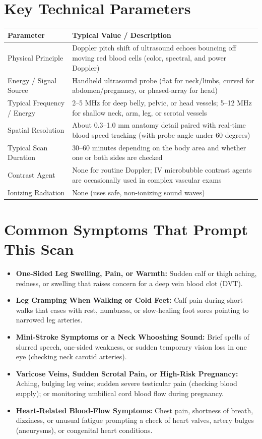 \section{Key Technical Parameters}
\noindent
\begin{tabularx}{\textwidth}{@{}l X@{}}
\toprule
\textbf{Parameter} & \textbf{Typical Value / Description} \\
\midrule
Physical Principle & Doppler pitch shift of ultrasound echoes bouncing off moving red blood cells (color, spectral, and power Doppler) \\
Energy / Signal Source & Handheld ultrasound probe (flat for neck/limbs, curved for abdomen/pregnancy, or phased-array for head) \\
Typical Frequency / Energy & 2--5 MHz for deep belly, pelvic, or head vessels; 5--12 MHz for shallow neck, arm, leg, or scrotal vessels \\
Spatial Resolution & About 0.3--1.0 mm anatomy detail paired with real-time blood speed tracking (with probe angle under 60 degrees) \\
Typical Scan Duration & 30--60 minutes depending on the body area and whether one or both sides are checked \\
Contrast Agent & None for routine Doppler; IV microbubble contrast agents are occasionally used in complex vascular exams \\
Ionizing Radiation & None (uses safe, non-ionizing sound waves) \\
\bottomrule
\end{tabularx}

\section{Common Symptoms That Prompt This Scan}
\begin{itemize}
\item \textbf{One-Sided Leg Swelling, Pain, or Warmth:} Sudden calf or thigh aching, redness, or swelling that raises concern for a deep vein blood clot (DVT).
\item \textbf{Leg Cramping When Walking or Cold Feet:} Calf pain during short walks that eases with rest, numbness, or slow-healing foot sores pointing to narrowed leg arteries.
\item \textbf{Mini-Stroke Symptoms or a Neck Whooshing Sound:} Brief spells of slurred speech, one-sided weakness, or sudden temporary vision loss in one eye (checking neck carotid arteries).
\item \textbf{Varicose Veins, Sudden Scrotal Pain, or High-Risk Pregnancy:} Aching, bulging leg veins; sudden severe testicular pain (checking blood supply); or monitoring umbilical cord blood flow during pregnancy.
\item \textbf{Heart-Related Blood-Flow Symptoms:} Chest pain, shortness of breath, dizziness, or unusual fatigue prompting a check of heart valves, artery bulges (aneurysms), or congenital heart conditions.
\end{itemize}

